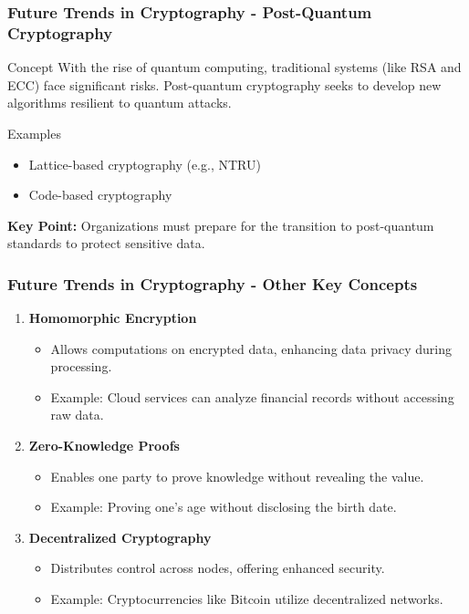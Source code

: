 \documentclass{beamer}
\begin{document}
\begin{frame}[fragile]
    \frametitle{Future Trends in Cryptography - Post-Quantum Cryptography}
    \begin{block}{Concept}  
    With the rise of quantum computing, traditional systems (like RSA and ECC) face significant risks. Post-quantum cryptography seeks to develop new algorithms resilient to quantum attacks.
    \end{block}
    
    \begin{block}{Examples}
    \begin{itemize}
        \item Lattice-based cryptography (e.g., NTRU)
        \item Code-based cryptography
    \end{itemize}
    \end{block}
    
    \textbf{Key Point:} Organizations must prepare for the transition to post-quantum standards to protect sensitive data.
\end{frame}

\begin{frame}[fragile]
    \frametitle{Future Trends in Cryptography - Other Key Concepts}
    \begin{enumerate}
        \item \textbf{Homomorphic Encryption}
        \begin{itemize}
            \item Allows computations on encrypted data, enhancing data privacy during processing.
            \item Example: Cloud services can analyze financial records without accessing raw data.
        \end{itemize}

        \item \textbf{Zero-Knowledge Proofs}
        \begin{itemize}
            \item Enables one party to prove knowledge without revealing the value.
            \item Example: Proving one's age without disclosing the birth date.
        \end{itemize}

        \item \textbf{Decentralized Cryptography}
        \begin{itemize}
            \item Distributes control across nodes, offering enhanced security.
            \item Example: Cryptocurrencies like Bitcoin utilize decentralized networks.
        \end{itemize}
    \end{enumerate}
\end{frame}
\end{document}
